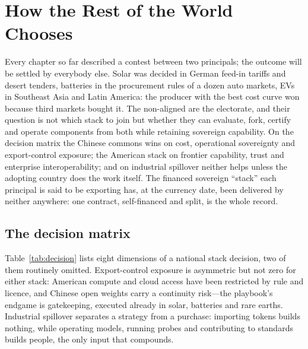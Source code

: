 \chapter{How the Rest of the World Chooses}
\label{c:world}

\begin{glance}
Every chapter so far described a contest between two principals; the outcome will be settled by everybody else. Solar was decided in German feed-in tariffs and desert tenders, batteries in the procurement rules of a dozen auto markets, EVs in Southeast Asia and Latin America: the producer with the best cost curve won because third markets bought it. The non-aligned are the electorate, and their question is not which stack to join but whether they can evaluate, fork, certify and operate components from both while retaining sovereign capability. On the decision matrix the Chinese commons wins on cost, operational sovereignty and export-control exposure; the American stack on frontier capability, trust and enterprise interoperability; and on industrial spillover neither helps unless the adopting country does the work itself. The financed sovereign ``stack'' each principal is said to be exporting has, at the currency date, been delivered by neither anywhere: one contract, self-financed and split, is the whole record.
\end{glance}

\section{The decision matrix}

Table~\ref{tab:decision} lists eight dimensions of a national stack decision, two of them routinely omitted. Export-control exposure is asymmetric but not zero for either stack: American compute and cloud access have been restricted by rule and licence, and Chinese open weights carry a continuity risk---the playbook's endgame is gatekeeping, executed already in solar, batteries and rare earths. Industrial spillover separates a strategy from a purchase: importing tokens builds nothing, while operating models, running probes and contributing to standards builds people, the only input that compounds.

